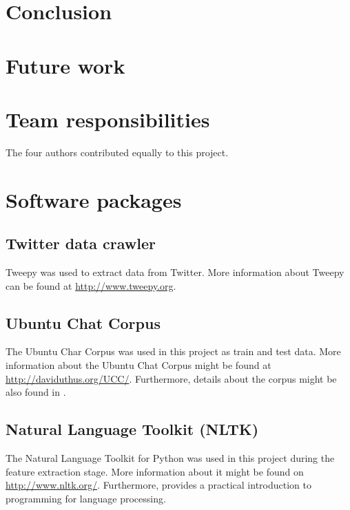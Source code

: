 \documentclass{article} %
\begin{document}
\section{Conclusion}



\section{Future work}



\section*{Team responsibilities}

\begin{comment}
Team responsibilities (1 paragraph)
• Who did what
\end{comment}

The four authors contributed equally to this project.

\section{Software packages}
\subsection*{Twitter data crawler}
Tweepy was used to extract data from Twitter. More information about Tweepy can be found at \url{http://www.tweepy.org}.

\subsection*{Ubuntu Chat Corpus \label{subsec:ubuntudata}}
The Ubuntu Char Corpus was used in this project as train and test data. More information about the Ubuntu Chat Corpus might be found at \url{http://daviduthus.org/UCC/}. Furthermore, details about the corpus might be also found in \cite{ubuntudata}.

\subsection*{Natural Language Toolkit (NLTK)}

The Natural Language Toolkit for Python was used in this project during the feature extraction stage. More information about it might be found on \url{http://www.nltk.org/}. Furthermore, \cite{nltk} provides a practical introduction to programming for language processing.
\end{document}
